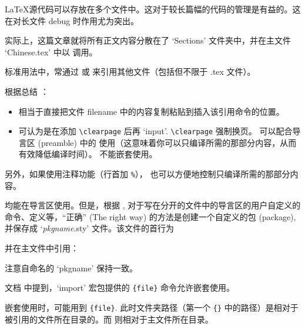 \LaTeX 源代码可以存放在多个文件中。这对于较长篇幅的代码的管理是有益的。这在对长文件 debug 时作用尤为突出。

实际上，这篇文章就将所有正文内容分散在了 `Sections' 文件夹中，并在主文件 `Chinese.tex' 中以 \verb|| 调用。

标准用法中，常通过 \verb|| 或 \verb|| 来引用其他文件（包括但不限于 .tex 文件）。

根据总结 \cite{input-include-tex}：
\begin{itemize}
\item \verb|| 相当于直接把文件 filename 中的内容复制粘贴到插入该引用命令的位置。
\item \verb|| 可认为是在添加 \verb|\clearpage| 后再 `input'. \verb|\clearpage| 强制换页。\verb|| 可以配合导言区 (preamble) 中的 \verb|| 使用（这意味着你可以只编译所需的那部分内容，从而有效降低编译时间）。\verb|| 不能嵌套使用。
\end{itemize}
另外，如果使用注释功能（行首加 \verb|%|），\verb|| 也可以方便地控制只编译所需的那部分内容。

\verb|| \verb|| 均能在导言区使用。但是，根据 \cite{input-include-overleaf}, 对于写在分开的文件中的导言区的用户自定义的命令、定义等，“正确” (The right way) 的方法是创建一个自定义的包 (package), 并保存成 `\emph{pkgname}.sty' 文件。该文件的首行为
\begin{texlst}
\end{texlst}
并在主文件中引用：
\begin{texlst}[numbers=none]
\usepackage{pkgname}
\end{texlst}
注意自命名的 `pkgname' 保持一致。

文档 \cite{input-include-overleaf} 中提到，`import' 宏包提供的 \verb|{file}| 命令允许嵌套使用。

嵌套使用时，可能用到 \verb|{file}|. 此时文件夹路径（第一个 \verb|{}| 中的路径）是相对于被引用的文件所在目录的。而 \verb|| 则相对于主文件所在目录。